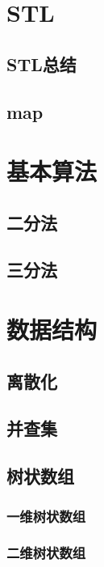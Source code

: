 \documentclass[a4paper, 12pt, twoside]{article}
\begin{document}
\section{STL}
\subsection{STL总结}

\subsection{map}


\section{基本算法}
\subsection{二分法}

\subsection{三分法}


\section{数据结构}
\subsection{离散化}

\subsection{并查集}


\subsection{树状数组}
\subsubsection{一维树状数组}

\subsubsection{二维树状数组}

\end{document}
